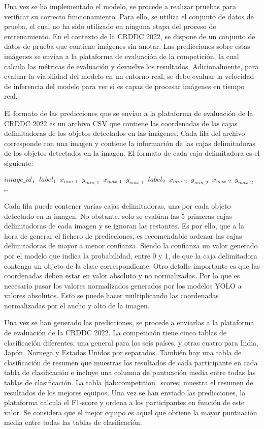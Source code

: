 Una vez se ha implementado el modelo, se procede a realizar pruebas para verificar su correcto funcionamiento. Para ello, se utiliza el conjunto de datos de prueba, el cual no ha sido utilizado en ninguna etapa del proceso de entrenamiento. En el contexto de la CRDDC 2022, se dispone de un conjunto de datos de prueba que contiene imágenes sin anotar. Las predicciones sobre estas imágenes se envían a la plataforma de evaluación de la competición, la cual calcula las métricas de evaluación y devuelve los resultados. Adicionalmente, para evaluar la viabilidad del modelo en un entorno real, se debe evaluar la velocidad de inferencia del modelo para ver si es capaz de procesar imágenes en tiempo real.

El formato de las predicciones que se envían a la plataforma de evaluación de la CRDDC 2022 es un archivo CSV que contiene las coordenadas de las cajas delimitadoras de los objetos detectados en las imágenes. Cada fila del archivo corresponde con una imagen y contiene la información de las cajas delimitadoras de los objetos detectados en la imagen. El formato de cada caja delimitadora es el siguiente:

\begin{center}
    \texttt{\(image\_id\), \(label_{1}\) \(x_{min, 1}\) \(y_{min, 1}\) \(x_{max, 1}\) \(y_{max, 1}\) \(label_{2}\) \(x_{min, 2}\) \(y_{min, 2}\) \(x_{max, 2}\) \(y_{max, 2}\) \dots}
\end{center}

Cada fila puede contener varias cajas delimitadoras, una por cada objeto detectado en la imagen. No obstante, solo se evalúan las 5 primeras cajas delimitadoras de cada imagen y se ignoran las restantes. Es por ello, que a la hora de generar el fichero de predicciones, es recomendable ordenar las cajas delimitadoras de mayor a menor confianza. Siendo la confianza un valor generado por el modelo que indica la probabilidad, entre 0 y 1, de que la caja delimitadora contenga un objeto de la clase correspondiente. Otro detalle importante es que las coordenadas deben estar en valor absoluto y no normalizadas. Por lo que es necesario pasar los valores normalizados generados por los modelos YOLO a valores absolutos. Esto se puede hacer multiplicando las coordenadas normalizadas por el ancho y alto de la imagen.

Una vez se han generado las predicciones, se procede a enviarlas a la plataforma de evaluación de la CRDDC 2022. La competición tiene cinco tablas de clasificación diferentes, una general para los seis países, y otras cuatro para India, Japón, Noruega y Estados Unidos por separados. También hay una tabla de clasificación de resumen que muestras los resultados de cada participante en cada tabla de clasificación e incluye una columna de puntuación media entre todas las tablas de clasificación. La tabla \ref{tab:competition_scores} muestra el resumen de resultados de los mejores equipos. Una vez se han enviado las predicciones, la plataforma calcula el F1-score y ordena a los participantes en función de este valor. Se considera que el mejor equipo es aquel que obtiene la mayor puntuación media entre todas las tablas de clasificación.

